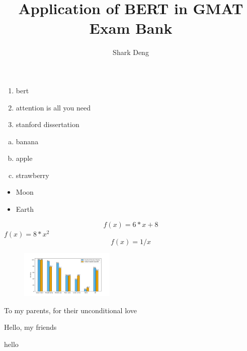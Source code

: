 \documentclass[a4paper] {report}
\begin{document}
\title {Application of BERT in GMAT Exam Bank}
\author {Shark Deng}

\begin {enumerate}
	\item bert
	\item attention is all you need
	\item stanford dissertation
\end {enumerate}

\begin {enumerate} [a)]
	\item banana
	\item apple
	\item strawberry
\end {enumerate}

\begin {itemize}
	\item Moon
	\item Earth
\end {itemize}


\begin {equation} %
	f(x) = 6*x+8
\end {equation}
$f(x) = 8*x^2$ %
$$f(x) = 1/x$$  %


\begin {figure}
	\includegraphics [width=1.77in] {../20190117/img/cnn_analysis.png}
\end {figure}


\begin {flushright}
	To my parents, for their unconditional love
\end {flushright}

\begin {flushleft}
	Hello, my friends
\end {flushleft}

\newpage
\begin {flushright}
	hello
\end {flushright}
\end{document}
